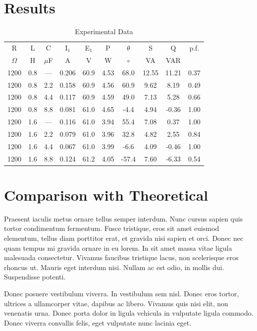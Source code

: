 \documentclass{article}
\begin{document}
\section{Results}
\begin{table}[h]
  \begin{center}
    \begin{tabular}{cccccccccc}
      \hline
      R & L & C & I$_1$ & E$_1$ & P & $\theta$ & S & Q & p.f. \\
      $\Omega$ & H & $\mu$F & A & V & W & $\circ$ & VA & VAR & \\
      \hline
      1200 & 0.8 & --- & 0.206 & 60.9 & 4.53 &  68.0 & 12.55 & 11.21 & 0.37 \\
      1200 & 0.8 & 2.2 & 0.158 & 60.9 & 4.56 &  60.9 &  9.62 &  8.19 & 0.49 \\
      1200 & 0.8 & 4.4 & 0.117 & 60.9 & 4.59 &  49.0 &  7.13 &  5.28 & 0.66 \\
      1200 & 0.8 & 8.8 & 0.081 & 61.0 & 4.65 &  -4.4 &  4.94 & -0.36 & 1.00 \\
      1200 & 1.6 & --- & 0.116 & 61.0 & 3.94 &  55.4 &  7.08 &  0.37 & 1.00 \\
      1200 & 1.6 & 2.2 & 0.079 & 61.0 & 3.96 &  32.8 &  4.82 &  2.55 & 0.84 \\
      1200 & 1.6 & 4.4 & 0.067 & 61.0 & 3.99 &  -6.6 &  4.09 & -0.46 & 1.00 \\
      1200 & 1.6 & 8.8 & 0.124 & 61.2 & 4.05 & -57.4 &  7.60 & -6.33 & 0.54 \\
      \hline
    \end{tabular}
    \caption{Experimental Data}
    \label{meas_dat}
  \end{center}
\end{table}

\section{Comparison with Theoretical}
Praesent iaculis metus ornare tellus semper interdum. Nunc cursus sapien quis
tortor condimentum fermentum. Fusce tristique, eros sit amet euismod elementum,
tellus diam porttitor erat, et gravida nisi sapien et orci. Donec nec quam
tempus mi gravida ornare in eu lorem. In sit amet massa vitae ligula malesuada
consectetur. Vivamus faucibus tristique lacus, non scelerisque eros rhoncus ut.
Mauris eget interdum nisi. Nullam ac est odio, in mollis dui. Suspendisse
potenti.

Donec posuere vestibulum viverra. In vestibulum sem nisl. Donec eros tortor,
ultrices a ullamcorper vitae, dapibus ac libero. Vivamus quis nisi elit, non
venenatis urna. Donec porta dolor in ligula vehicula in vulputate ligula
commodo. Donec viverra convallis felis, eget vulputate nunc lacinia eget. 
\end{document}
